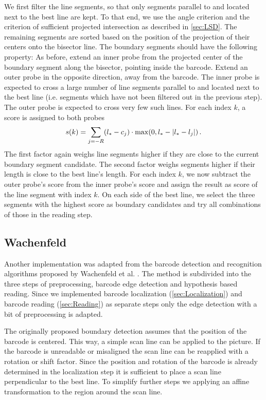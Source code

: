 We first filter the line segments, so that only segments parallel to and located
next to the best
line are kept. To that end, we use the angle criterion and the criterion of sufficient
projected intersection as described in \cref{sec:LSD}. The remaining segments
are sorted based on the position of the projection of their centers onto the
bisector line. The boundary segments should have the following property: As before,
extend an inner probe from the projected center of the boundary segment along the bisector, pointing inside the
barcode. Extend an outer probe in the opposite direction, away from the barcode.
The inner probe is expected to cross a large number of line segments parallel to
and located next to the best line (i.e. segments which have not been
filtered out in the previous step). The outer probe is expected to cross very few
such lines.
For each index $k$, a score is assigned to both probes
\begin{equation*}
 s(k)=\sum_{j=-R}(l_*-c_j)\cdot \max(0, l_*-\lvert l_*-l_j\rvert)\,.
\end{equation*}
The first factor again weighs line segments higher if they are close to the
current boundary segment candidate. The second factor weighs segments higher if
their length is close to the best line's length.
For each index $k$, we now subtract the outer probe's score from the inner
probe's score and assign the result as score of the line segment with index $k$.
On each side of the best line, we select the three segments with the highest
score as boundary candidates and try all combinations of those in the reading step.

\subsection[Wachenfeld]{Wachenfeld}
Another implementation was adapted from the barcode detection and recognition algorithms proposed by Wachenfeld et al. \cite{wachenfeld2008robust}. The method is subdivided into the three steps of preprocessing, barcode edge detection and hypothesis based reading. Since we implemented barcode localization (\cref{sec:Localization}) and barcode reading (\cref{sec:Reading}) as separate steps only the edge detection with a bit of preprocessing is adapted.

The originally proposed boundary detection assumes that the position of the barcode is centered. This way, a simple scan line can be applied to the picture. If the barcode is unreadable or misaligned the scan line can be reapplied with a rotation or shift factor. Since the position and rotation of the barcode is already determined in the localization step it is sufficient to place a scan line perpendicular to the best line. To simplify further steps we applying an affine transformation to the region around the scan line.

